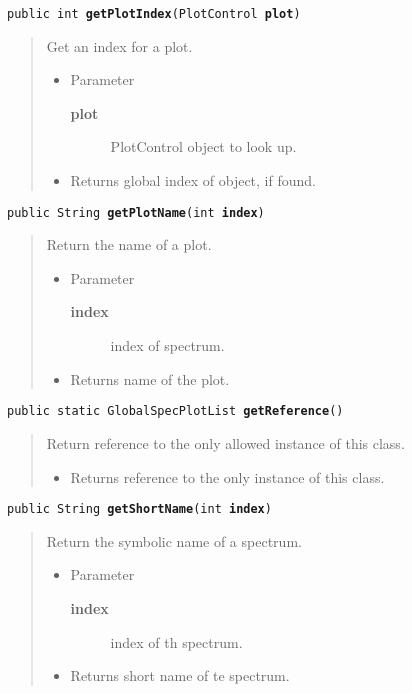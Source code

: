 \documentclass[twoside,11pt,nolof]{starlink}
\providecommand{\method}[1]{\texttt{#1}}
\newenvironment{desc}{\begin{quote}}{\end{quote}}
\begin{document}
\method{public int \textbf{getPlotIndex}(\texttt{PlotControl} \textbf{plot})\label{l285}\label{l286}}
\begin{desc}Get an index for a plot.
\begin{itemize}
\item{Parameter
  \begin{description}
   \item[\textbf{plot}]{PlotControl object to look up.}
  \end{description}}
\end{itemize}
\begin{itemize}
\item{Returns global index of object, if found. }
\end{itemize}
\end{desc}

\method{public String \textbf{getPlotName}(\texttt{int} \textbf{index})\label{l287}\label{l288}}
\begin{desc}Return the name of a plot.
\begin{itemize}
\item{Parameter
  \begin{description}
   \item[\textbf{index}]{index of spectrum.}
  \end{description}}
\end{itemize}
\begin{itemize}
\item{Returns name of the plot. }
\end{itemize}
\end{desc}

\method{public static GlobalSpecPlotList \textbf{getReference}()\label{l289}\label{l290}}
\begin{desc}Return reference to the only allowed instance of this class.
\begin{itemize}
\item{Returns reference to the only instance of this class. }
\end{itemize}
\end{desc}

\method{public String \textbf{getShortName}(\texttt{int} \textbf{index})\label{l291}\label{l292}}
\begin{desc}Return the symbolic name of a spectrum.
\begin{itemize}
\item{Parameter
  \begin{description}
   \item[\textbf{index}]{index of th spectrum.}
  \end{description}}
\end{itemize}
\begin{itemize}
\item{Returns short name of te spectrum. }
\end{itemize}
\end{desc}
\end{document}
